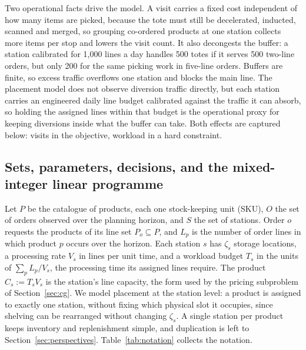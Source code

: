 \documentclass[]{interact}
\begin{document}
Two operational facts drive the model. A visit carries a fixed cost independent of how many items are picked, because the tote must still be decelerated, inducted, scanned and merged, so grouping co-ordered products at one station collects more items per stop and lowers the visit count. It also decongests the buffer: a station calibrated for 1,000 lines a day handles 500 totes if it serves 500 two-line orders, but only 200 for the same picking work in five-line orders. Buffers are finite, so excess traffic overflows one station and blocks the main line. The placement model does not observe diversion traffic directly, but each station carries an engineered daily line budget calibrated against the traffic it can absorb, so holding the assigned lines within that budget is the operational proxy for keeping diversions inside what the buffer can take. Both effects are captured below: visits in the objective, workload in a hard constraint.

\subsection{Sets, parameters, decisions, and the mixed-integer linear programme}
Let $P$ be the catalogue of products, each one stock-keeping unit (SKU), $O$ the set of orders observed over the planning horizon, and $S$ the set of stations. Order $o$ requests the products of its line set $P_o \subseteq P$, and $L_p$ is the number of order lines in which product $p$ occurs over the horizon. Each station $s$ has $\zeta_s$ storage locations, a processing rate $V_s$ in lines per unit time, and a workload budget $T_s$ in the units of $\sum_{p} L_p/V_s$, the processing time its assigned lines require. The product $C_s := T_s V_s$ is the station's line capacity, the form used by the pricing subproblem of Section~\ref{sec:cg}. We model placement at the station level: a product is assigned to exactly one station, without fixing which physical slot it occupies, since shelving can be rearranged without changing $\zeta_s$. A single station per product keeps inventory and replenishment simple, and duplication is left to Section~\ref{sec:perspectives}. Table~\ref{tab:notation} collects the notation.
\end{document}
